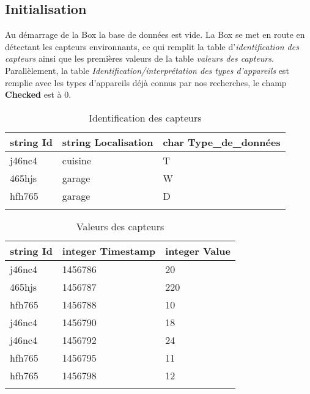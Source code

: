 \documentclass[10pt,a4paper]{article}
\begin{document}
\subsection{Initialisation}
Au démarrage de la Box la base de données est vide. La Box se met en route en détectant les capteurs environnants, ce qui remplit la table d'\textit{identification des capteurs} ainsi que les premières valeurs de la table\textit{ valeurs des capteurs}. Parallèlement, la table \textit{Identification/interprétation des types d'appareils} est remplie avec les types d'appareils déjà connus par nos recherches, le champ \textbf{Checked} est à 0. \\
\begin{table}[h!]
    \centering
    \begin{tabular}{|l|l|l|}
    \hline
    \rowcolor[HTML]{EFEFEF} 
    string Id & string Localisation & char Type\_de\_données \\ \hline
    j46nc4    & cuisine             & T                      \\ \hline
    465hjs    & garage              & W                      \\ \hline
    hfh765    & garage              & D                      \\ \hline
              &                     &                       
    \end{tabular}
    \caption{Identification des capteurs}
\end{table}

\begin{table}[h!]
\centering
    \begin{tabular}{|l|l|l|}
    \hline
    \rowcolor[HTML]{EFEFEF} 
    string Id & integer Timestamp & integer Value \\ \hline
    j46nc4    & 1456786           & 20            \\ \hline
    465hjs    & 1456787           & 220           \\ \hline
    hfh765    & 1456788           & 10            \\ \hline
    j46nc4    & 1456790           & 18            \\ \hline
    j46nc4    & 1456792           & 24            \\ \hline
    hfh765    & 1456795           & 11            \\ \hline
    hfh765    & 1456798           & 12            \\ \hline
              &                   &              
    \end{tabular}
    \caption{Valeurs des capteurs}
\end{table}
\end{document}
